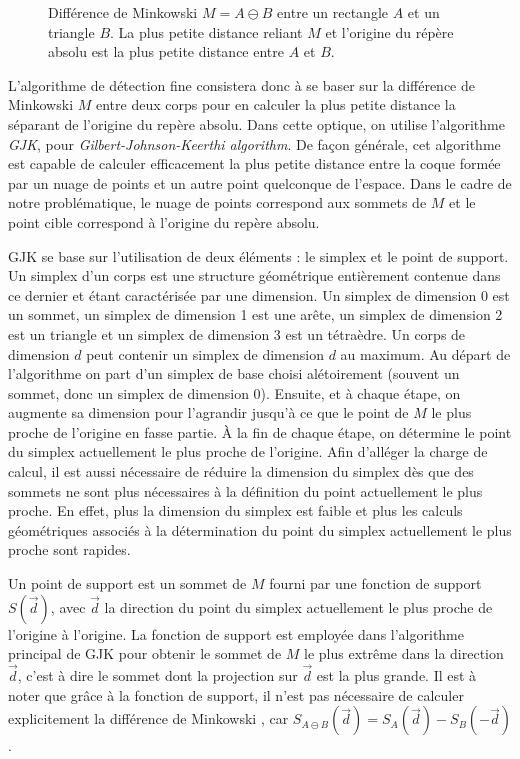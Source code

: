 \begin{figure}
  \centering
  \subfloat{  }
  \subfloat{  }
  \caption{Différence de Minkowski $M = A \ominus B$ entre un
    rectangle $A$ et un triangle $B$. La plus petite distance reliant
    $M$ et l'origine du répère absolu est la plus petite distance
    entre $A$ et $B$.}
  \label{minkowski}
\end{figure}

L'algorithme de détection fine consistera donc à se baser sur la
différence de Minkowski $M$ entre deux corps pour en calculer la plus
petite distance la séparant de l'origine du repère absolu. Dans cette
optique, on utilise l'algorithme \textit{GJK}, pour
\textit{Gilbert-Johnson-Keerthi algorithm}. De façon générale, cet
algorithme est capable de calculer efficacement la plus petite
distance entre la coque formée par un nuage de points et un autre
point quelconque de l'espace. Dans le cadre de notre problématique, le
nuage de points correspond aux sommets de $M$ et le point cible
correspond à l'origine du repère absolu.

GJK se base sur l'utilisation de deux éléments : le simplex et le
point de support. Un simplex d'un corps est une structure géométrique
entièrement contenue dans ce dernier et étant caractérisée par une
dimension. Un simplex de dimension 0 est un sommet, un simplex de
dimension 1 est une arête, un simplex de dimension 2 est un triangle
et un simplex de dimension 3 est un tétraèdre. Un corps de dimension
$d$ peut contenir un simplex de dimension $d$ au maximum. Au départ de
l'algorithme on part d'un simplex de base choisi alétoirement (souvent
un sommet, donc un simplex de dimension 0). Ensuite, et à chaque
étape, on augmente sa dimension pour l'agrandir jusqu'à ce que le
point de $M$ le plus proche de l'origine en fasse partie. \`A la fin
de chaque étape, on détermine le point du simplex actuellement le plus
proche de l'origine. Afin d'alléger la charge de calcul, il est aussi
nécessaire de réduire la dimension du simplex dès que des sommets ne
sont plus nécessaires à la définition du point actuellement le plus
proche. En effet, plus la dimension du simplex est faible et plus les
calculs géométriques associés à la détermination du point du simplex
actuellement le plus proche sont rapides.

Un point de support est un sommet de $M$ fourni par une fonction de
support $S(\vec{d})$, avec $\vec{d}$ la direction du point du simplex
actuellement le plus proche de l'origine à l'origine. La fonction de
support est employée dans l'algorithme principal de GJK pour obtenir
le sommet de $M$ le plus extrême dans la direction $\vec{d}$, c'est à
dire le sommet dont la projection sur $\vec{d}$ est la plus grande. Il
est à noter que grâce à la fonction de support, il n'est pas nécessaire
de calculer explicitement la différence de Minkowski \cite{ericson},
car $S_{A \ominus B}(\vec{d}) = S_A(\vec{d}) - S_B(-\vec{d})$.


